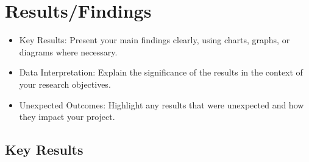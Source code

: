 
\section{Results/Findings}

\begin{itemize}
    \item Key Results: Present your main findings clearly, using charts, graphs, or diagrams where necessary.
    \item Data Interpretation: Explain the significance of the results in the context of your research objectives.
    \item Unexpected Outcomes: Highlight any results that were unexpected and how they impact your project.
\end{itemize}








\subsection{Key Results}

